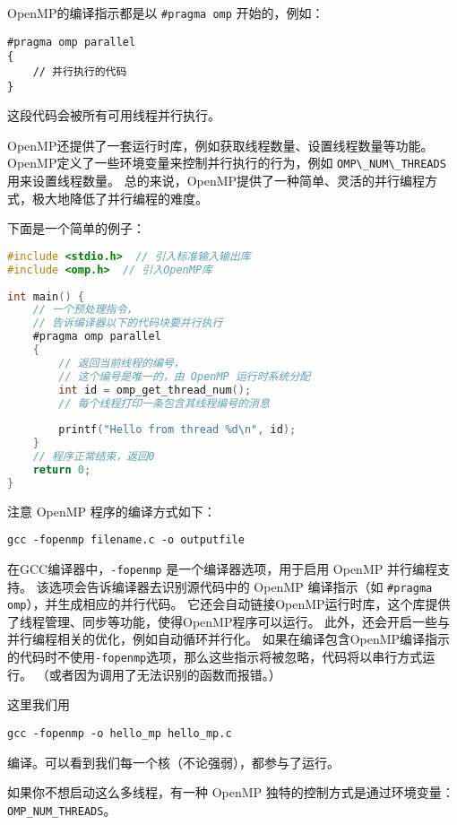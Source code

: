 \documentclass{ctexart}
\begin{document}
OpenMP的编译指示都是以 \verb|#pragma omp| 开始的，例如：  
  
\begin{verbatim}  
#pragma omp parallel  
{  
    // 并行执行的代码  
}  
\end{verbatim}  
  
这段代码会被所有可用线程并行执行。  
  
OpenMP还提供了一套运行时库，例如获取线程数量、设置线程数量等功能。  
OpenMP定义了一些环境变量来控制并行执行的行为，例如 \verb|OMP\_NUM\_THREADS| 用来设置线程数量。  
总的来说，OpenMP提供了一种简单、灵活的并行编程方式，极大地降低了并行编程的难度。  

下面是一个简单的例子：
\begin{lstlisting}[language=C]  
#include <stdio.h>  // 引入标准输入输出库  
#include <omp.h>  // 引入OpenMP库  
      
int main() {  
    // 一个预处理指令，
    // 告诉编译器以下的代码块要并行执行  
    #pragma omp parallel  
    {  
        // 返回当前线程的编号，
        // 这个编号是唯一的，由 OpenMP 运行时系统分配  
        int id = omp_get_thread_num();  
        // 每个线程打印一条包含其线程编号的消息  
        
        printf("Hello from thread %d\n", id);  
    }  
    // 程序正常结束，返回0  
    return 0;  
}  
\end{lstlisting}  

注意 OpenMP 程序的编译方式如下：
\begin{verbatim}  
gcc -fopenmp filename.c -o outputfile  
\end{verbatim}  

在GCC编译器中，\verb|-fopenmp| 是一个编译器选项，用于启用 OpenMP 并行编程支持。  
该选项会告诉编译器去识别源代码中的 OpenMP 编译指示（如 \verb|#pragma omp|），并生成相应的并行代码。  
它还会自动链接OpenMP运行时库，这个库提供了线程管理、同步等功能，使得OpenMP程序可以运行。  
此外，还会开启一些与并行编程相关的优化，例如自动循环并行化。  
如果在编译包含OpenMP编译指示的代码时不使用\verb|-fopenmp|选项，那么这些指示将被忽略，代码将以串行方式运行。  
（或者因为调用了无法识别的函数而报错。）

这里我们用
\begin{verbatim}
gcc -fopenmp -o hello_mp hello_mp.c
\end{verbatim}
编译。可以看到我们每一个核（不论强弱），都参与了运行。

如果你不想启动这么多线程，有一种 OpenMP 独特的控制方式是通过环境变量：\verb|OMP_NUM_THREADS|。
\end{document}
